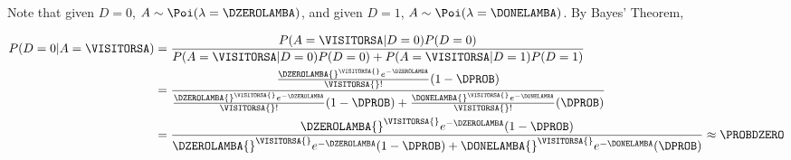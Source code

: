 Note that given $D = 0$, $A\sim\Poi(\lambda = \DZEROLAMBA)$, and given $D = 1$, $A\sim\Poi(\lambda = \DONELAMBA)$. By Bayes' Theorem,

\begin{align*}
P(D = 0 | A = \VISITORSA) &= \dfrac{P(A = \VISITORSA | D = 0) P(D = 0)}{P(A = \VISITORSA | D = 0) P(D = 0) + P(A = \VISITORSA | D = 1) P(D = 1)} \\
&= \dfrac{\frac{\DZEROLAMBA{}^{\VISITORSA{}} e^{-\DZEROLAMBA}}{\VISITORSA{}!} (1 - \DPROB)}{ \frac{\DZEROLAMBA{}^{\VISITORSA{}} e^{-\DZEROLAMBA}}{\VISITORSA{}!} (1 - \DPROB) + \frac{\DONELAMBA{}^{\VISITORSA{}} e^{-\DONELAMBA}}{\VISITORSA{}!} (\DPROB)} \\
& = \dfrac{\DZEROLAMBA{}^{\VISITORSA{}} e^{-\DZEROLAMBA} (1 - \DPROB)}{ \DZEROLAMBA{}^{\VISITORSA{}} e^{-\DZEROLAMBA} (1 - \DPROB) + \DONELAMBA{}^{\VISITORSA{}} e^{-\DONELAMBA} (\DPROB)}
  \approx \PROBDZERO
\end{align*}